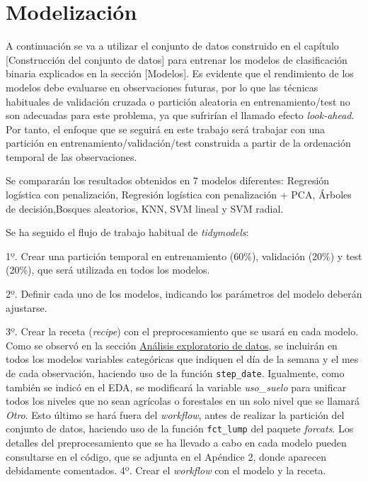 \documentclass[12pt,a4paper,]{book}
\numberwithin{dummy}{section}
\theoremstyle{ocrenumbox}
\theoremstyle{blacknumex}
\theoremstyle{blacknumbox}
\theoremstyle{ocrenum}
\theoremstyle{ocrenum}
\begin{document}
\hypertarget{modelizaciuxf3n}{%
\section{Modelización}\label{modelizaciuxf3n}}

A continuación se va a utilizar el conjunto de datos construido en el
capítulo {[}Construcción del conjunto de datos{]} para entrenar los
modelos de clasificación binaria explicados en la sección {[}Modelos{]}.
Es evidente que el rendimiento de los modelos debe evaluarse en
observaciones futuras, por lo que las técnicas habituales de validación
cruzada o partición aleatoria en entrenamiento/test no son adecuadas
para este problema, ya que sufrirían el llamado efecto
\emph{look-ahead}. Por tanto, el enfoque que se seguirá en este trabajo
será trabajar con una partición en entrenamiento/validación/test
construida a partir de la ordenación temporal de las observaciones.

Se compararán los resultados obtenidos en 7 modelos diferentes:
Regresión logística con penalización, Regresión logística con
penalización + PCA, Árboles de decisión,Bosques aleatorios, KNN, SVM
lineal y SVM radial.

Se ha seguido el flujo de trabajo habitual de \emph{tidymodels}:

1º. Crear una partición temporal en entrenamiento (60\%), validación
(20\%) y test (20\%), que será utilizada en todos los modelos.

2º. Definir cada uno de los modelos, indicando los parámetros del modelo
deberán ajustarse.

3º. Crear la receta (\emph{recipe}) con el preprocesamiento que se usará
en cada modelo. Como se observó en la sección
\protect\hyperlink{anuxe1lisis-exploratorio-de-datos}{Análisis
exploratorio de datos}, se incluirán en todos los modelos variables
categóricas que indiquen el día de la semana y el mes de cada
observación, haciendo uso de la función \texttt{step\_date}. Igualmente,
como también se indicó en el EDA, se modificará la variable
\emph{uso\_suelo} para unificar todos los niveles que no sean agrícolas
o forestales en un solo nivel que se llamará \emph{Otro}. Esto último se
hará fuera del \emph{workflow}, antes de realizar la partición del
conjunto de datos, haciendo uso de la función \texttt{fct\_lump} del
paquete \emph{forcats}. Los detalles del preprocesamiento que se ha
llevado a cabo en cada modelo pueden consultarse en el código, que se
adjunta en el Apéndice 2, donde aparecen debidamente comentados. 4º.
Crear el \emph{workflow} con el modelo y la receta.
\end{document}
